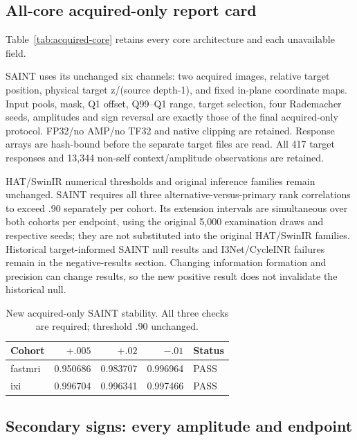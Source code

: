 \subsection{All-core acquired-only report card}


Table~\ref{tab:acquired-core} retains every core architecture and each unavailable field.

SAINT uses its unchanged six channels: two acquired images, relative target position, physical target z/(source depth-1), and fixed in-plane coordinate maps. Input pools, mask, Q1 offset, Q99--Q1 range, target selection, four Rademacher seeds, amplitudes and sign reversal are exactly those of the final acquired-only protocol. FP32/no AMP/no TF32 and native clipping are retained. Response arrays are hash-bound before the separate target files are read. All 417 target responses and 13,344 non-self context/amplitude observations are retained.

HAT/SwinIR numerical thresholds and original inference families remain unchanged. SAINT requires all three alternative-versus-primary rank correlations to exceed .90 separately per cohort. Its extension intervals are simultaneous over both cohorts per endpoint, using the original 5,000 examination draws and respective seeds; they are not substituted into the original HAT/SwinIR families. Historical target-informed SAINT null results and I3Net/CycleINR failures remain in the negative-results section. Changing information formation and precision can change results, so the new positive result does not invalidate the historical null.

\begin{table}[t]\centering\small\caption{New acquired-only SAINT stability. All three checks are required; threshold .90 unchanged.}\begin{tabular}{lrrrl}\toprule Cohort & $+.005$ & $+.02$ & $-.01$ & Status\\\midrule

fastmri & 0.950686 & 0.983707 & 0.996964 & PASS \\

ixi & 0.996704 & 0.996341 & 0.997466 & PASS \\

\bottomrule\end{tabular}\end{table}

\subsection{Secondary signs: every amplitude and endpoint}

